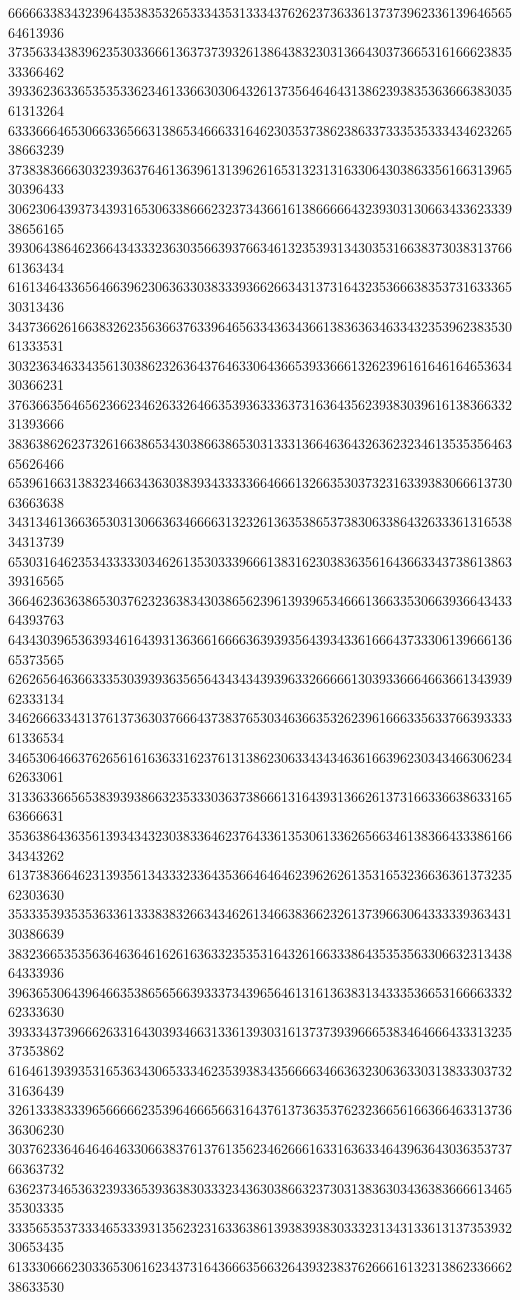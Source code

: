 66666338343239643538353265333435313334376262373633613737396233613964656564613936
37356334383962353033666136373739326138643832303136643037366531616662383533366462
39336236336535353362346133663030643261373564646431386239383536366638303561313264
63336664653066336566313865346663316462303537386238633733353533343462326538663239
37383836663032393637646136396131396261653132313163306430386335616631396530396433
30623064393734393165306338666232373436616138666664323930313066343362333938656165
39306438646236643433323630356639376634613235393134303531663837303831376661363434
61613464336564663962306363303833393662663431373164323536663835373163336530313436
34373662616638326235636637633964656334363436613836363463343235396238353061333531
30323634633435613038623263643764633064366539336661326239616164616465363430366231
37636635646562366234626332646635393633363731636435623938303961613836633231393666
38363862623732616638653430386638653031333136646364326362323461353535646365626466
65396166313832346634363038393433333664666132663530373231633938306661373063663638
34313461366365303130663634666631323261363538653738306338643263336131653834313739
65303164623534333330346261353033396661383162303836356164366334373861386339316565
36646236363865303762323638343038656239613939653466613663353066393664343364393763
64343039653639346164393136366166663639393564393433616664373330613966613665373565
62626564636633353039393635656434343439396332666661303933666466366134393962333134
34626663343137613736303766643738376530346366353262396166633563376639333361336534
34653064663762656161636331623761313862306334343463616639623034346630623462633061
31336336656538393938663235333036373866613164393136626137316633663863316563666631
35363864363561393434323038336462376433613530613362656634613836643338616634343262
61373836646231393561343332336435366464646239626261353165323663636137323562303630
35333539353536336133383832663434626134663836623261373966306433333936343130386639
38323665353563646364616261636332353531643261663338643535356330663231343864333936
39636530643964663538656566393337343965646131613638313433353665316666333262333630
39333437396662633164303934663133613930316137373939666538346466643331323537353862
61646139393531653634306533346235393834356666346636323063633031383330373231636439
32613338333965666662353964666566316437613736353762323665616636646331373636306230
30376233646464646330663837613761356234626661633163633464396364303635373766363732
63623734653632393365393638303332343630386632373031383630343638366661346535303335
33356535373334653339313562323163363861393839383033323134313361313735393230653435
61333066623033653061623437316436663566326439323837626661613231386233666238633530
